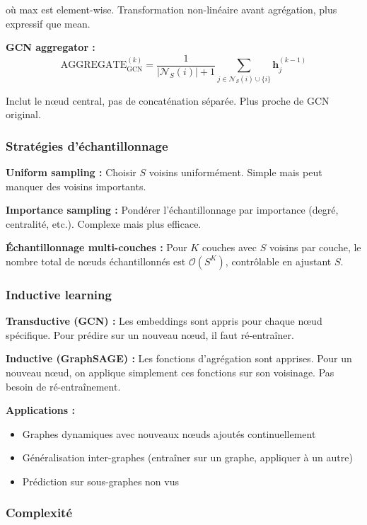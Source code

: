 où max est element-wise. Transformation non-linéaire avant agrégation, plus expressif que mean.

\textbf{GCN aggregator :}
\[
\text{AGGREGATE}_{\text{GCN}}^{(k)} = \frac{1}{|\mathcal{N}_S(i)| + 1}\sum_{j \in \mathcal{N}_S(i) \cup \{i\}} \mathbf{h}_j^{(k-1)}
\]

Inclut le nœud central, pas de concaténation séparée. Plus proche de GCN original.

\subsubsection{Stratégies d'échantillonnage}

\textbf{Uniform sampling :}
Choisir $S$ voisins uniformément. Simple mais peut manquer des voisins importants.

\textbf{Importance sampling :}
Pondérer l'échantillonnage par importance (degré, centralité, etc.). Complexe mais plus efficace.

\textbf{Échantillonnage multi-couches :}
Pour $K$ couches avec $S$ voisins par couche, le nombre total de nœuds échantillonnés est $\mathcal{O}(S^K)$, contrôlable en ajustant $S$.

\subsubsection{Inductive learning}

\textbf{Transductive (GCN) :}
Les embeddings sont appris pour chaque nœud spécifique. Pour prédire sur un nouveau nœud, il faut ré-entraîner.

\textbf{Inductive (GraphSAGE) :}
Les fonctions d'agrégation sont apprises. Pour un nouveau nœud, on applique simplement ces fonctions sur son voisinage. Pas besoin de ré-entraînement.

\textbf{Applications :}
\begin{itemize}
    \item Graphes dynamiques avec nouveaux nœuds ajoutés continuellement
    \item Généralisation inter-graphes (entraîner sur un graphe, appliquer à un autre)
    \item Prédiction sur sous-graphes non vus
\end{itemize}

\subsubsection{Complexité}

